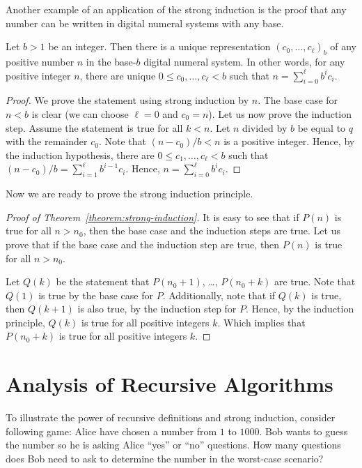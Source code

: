 Another example of an application of the strong induction is the proof that
any number can be written in digital numeral systems with any base.
\begin{theorem}
  Let $b > 1$ be an integer. Then there is a unique representation 
  $(c_0, \dots, c_\ell)_b$ of any positive number $n$ in the base-$b$ digital
  numeral system. 
  In other words, for any positive integer $n$, there are unique 
  $0 \le c_0, \dots, c_\ell < b$ such that $n = \sum_{i = 0}^\ell b^i c_i$.
\end{theorem}
\begin{proof}
  We prove the statement using strong induction by $n$. The base case for
  $n < b$ is clear (we can choose $\ell = 0$ and $c_0 = n$).
  Let us now prove the induction step. Assume the statement is true for all
  $k < n$. Let $n$ divided by $b$ be equal to $q$ with the remainder $c_0$.
  Note that $(n - c_0) / b < n$ is a positive integer. Hence,
  by the induction hypothesis, there are
  $0 \le c_1, \dots, c_\ell < b$
  such that $(n - c_0) / b = \sum_{i = 1}^\ell b^{i - 1} c_i$. Hence,
  $n = \sum_{i = 0}^\ell b^i c_i$.
\end{proof}


Now we are ready to prove the strong induction principle.
\begin{proof}[Proof of Theorem~\ref{theorem:strong-induction}]
  It is easy to see that if $P(n)$ is true for all $n > n_0$, then the base
  case and the induction steps are true. Let us prove that if the base case and
  the induction step are true, then $P(n)$ is true for all $n > n_0$.

  Let $Q(k)$ be the statement that $P(n_0 + 1)$, \dots, $P(n_0 + k)$ are true.
  Note that $Q(1)$ is true by the base case for $P$. Additionally, note that if
  $Q(k)$ is true, then $Q(k + 1)$ is also true, by the induction step for $P$.
  Hence, by the induction principle, $Q(k)$ is true for all positive integers
  $k$. Which implies that $P(n_0 + k)$ is true for all positive integers $k$.
\end{proof}


\section{Analysis of Recursive Algorithms}
\label{section:strong-induction-recursive}
To illustrate the power of recursive definitions and strong induction, consider
following game: Alice have chosen a number from $1$ to $1000$. Bob wants to
guess the number so he is asking Alice ``yes'' or ``no'' questions.
How many questions does Bob need to ask to determine the number in the
worst-case scenario?

